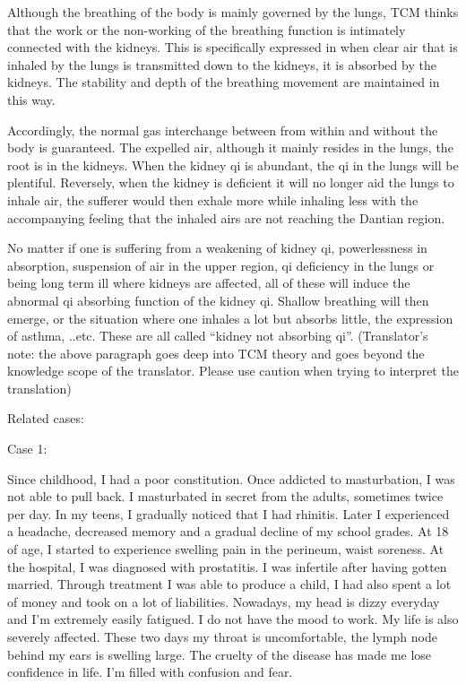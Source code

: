 \documentclass[
]{book}
\begin{document}
Although the breathing of the body is mainly governed by the lungs, TCM thinks that the work or the non-working of the breathing function is intimately connected with the kidneys. This is specifically expressed in when clear air that is inhaled by the lungs is transmitted down to the kidneys, it is absorbed by the kidneys. The stability and depth of the breathing movement are maintained in this way.

Accordingly, the normal gas interchange between from within and without the body is guaranteed. The expelled air, although it mainly resides in the lungs, the root is in the kidneys. When the kidney qi is abundant, the qi in the lungs will be plentiful. Reversely, when the kidney is deficient it will no longer aid the lungs to inhale air, the sufferer would then exhale more while inhaling less with the accompanying feeling that the inhaled airs are not reaching the Dantian region.

No matter if one is suffering from a weakening of kidney qi, powerlessness in absorption, suspension of air in the upper region, qi deficiency in the lungs or being long term ill where kidneys are affected, all of these will induce the abnormal qi absorbing function of the kidney qi. Shallow breathing will then emerge, or the situation where one inhales a lot but absorbs little, the expression of asthma, ..etc. These are all called ``kidney not absorbing qi''. (Translator's note: the above paragraph goes deep into TCM theory and goes beyond the knowledge scope of the translator. Please use caution when trying to interpret the translation)

Related cases:

Case 1:

Since childhood, I had a poor constitution. Once addicted to masturbation, I was not able to pull back. I masturbated in secret from the adults, sometimes twice per day. In my teens, I gradually noticed that I had rhinitis. Later I experienced a headache, decreased memory and a gradual decline of my school grades. At 18 of age, I started to experience swelling pain in the perineum, waist soreness. At the hospital, I was diagnosed with prostatitis. I was infertile after having gotten married. Through treatment I was able to produce a child, I had also spent a lot of money and took on a lot of liabilities. Nowadays, my head is dizzy everyday and I'm extremely easily fatigued. I do not have the mood to work. My life is also severely affected. These two days my throat is uncomfortable, the lymph node behind my ears is swelling large. The cruelty of the disease has made me lose confidence in life. I'm filled with confusion and fear.
\end{document}
